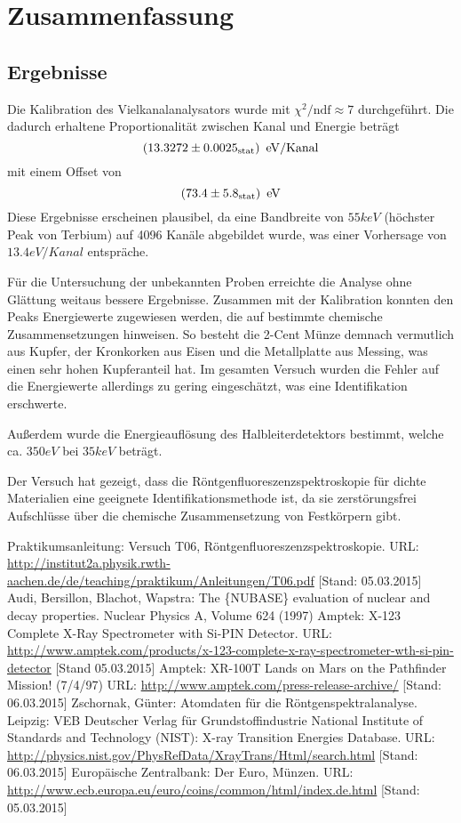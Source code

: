 \documentclass{../Misc/MontavonLaTeX/Montavon}
\begin{document}
\section{Zusammenfassung}
\subsection{Ergebnisse}
Die Kalibration des Vielkanalanalysators wurde mit $\chi^2 / \textrm{ndf} \approx 7$ durchgeführt. Die dadurch erhaltene Proportionalität zwischen Kanal und Energie beträgt \[ (13.3272 \pm 0.0025_\textrm{stat}) \enskip \mathrm{eV / Kanal} \]mit einem Offset von \[ (73.4 \pm 5.8_\textrm{stat}) \enskip \mathrm{eV} \]
Diese Ergebnisse erscheinen plausibel, da eine Bandbreite von $55 \unit{keV}$ (höchster Peak von Terbium) auf 4096 Kanäle abgebildet wurde, was einer Vorhersage von $13.4 \unit{eV / Kanal}$ entspräche.

Für die Untersuchung der unbekannten Proben erreichte  die Analyse ohne Glättung weitaus bessere Ergebnisse.
Zusammen mit der Kalibration konnten den Peaks Energiewerte zugewiesen werden, die auf bestimmte chemische Zusammensetzungen hinweisen. So besteht die 2-Cent Münze demnach vermutlich aus Kupfer, der Kronkorken aus Eisen und die Metallplatte aus Messing, was einen sehr hohen Kupferanteil hat. Im gesamten Versuch wurden die Fehler auf die Energiewerte allerdings zu gering eingeschätzt, was eine Identifikation erschwerte.

Außerdem wurde die Energieauflösung des Halbleiterdetektors bestimmt, welche ca. $350 \unit{eV}$ bei $35 \unit{keV}$ beträgt.

Der Versuch hat gezeigt, dass die Röntgenfluoreszenzspektroskopie für dichte Materialien eine geeignete Identifikationsmethode ist, da sie zerstörungsfrei Aufschlüsse über die chemische Zusammensetzung von Festkörpern gibt.


\begin{thebibliography}{xxxx}
 Praktikumsanleitung: Versuch T06, Röntgenfluoreszenzspektroskopie. URL: \url{http://institut2a.physik.rwth-aachen.de/de/teaching/praktikum/Anleitungen/T06.pdf} [Stand: 05.03.2015]
 Audi, Bersillon, Blachot, Wapstra: The \{NUBASE\} evaluation of nuclear and decay properties. Nuclear Physics A, Volume 624 (1997)
 Amptek: X-123 Complete X-Ray Spectrometer with Si-PIN Detector. URL: \url{http://www.amptek.com/products/x-123-complete-x-ray-spectrometer-wth-si-pin-detector} [Stand 05.03.2015]
 Amptek: XR-100T Lands on Mars on the Pathfinder Mission! (7/4/97) URL: \url{http://www.amptek.com/press-release-archive/} [Stand: 06.03.2015]
 Zschornak, Günter: Atomdaten für die Röntgenspektralanalyse. Leipzig: VEB Deutscher Verlag für Grundstoffindustrie
 National Institute of Standards and Technology (NIST): X-ray Transition Energies Database. URL: \url{http://physics.nist.gov/PhysRefData/XrayTrans/Html/search.html} [Stand: 06.03.2015]
 Europäische Zentralbank: Der Euro, Münzen. URL: \url{http://www.ecb.europa.eu/euro/coins/common/html/index.de.html} [Stand: 05.03.2015]
\end{thebibliography}
\end{document}
